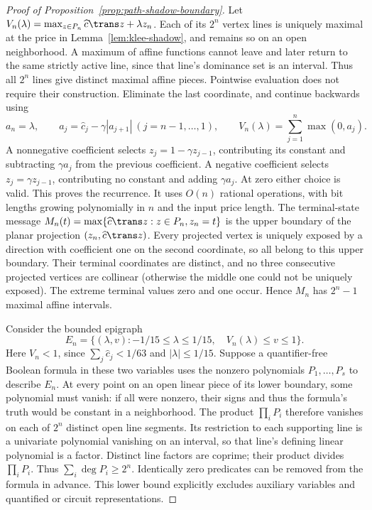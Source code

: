 \begin{proof}[Proof of Proposition~\ref{prop:path-shadow-boundary}]
Let \(V_n(\lambda)=\max_{z\in P_n}\widehat c\trans z+\lambda z_n\).
Each of its \(2^n\) vertex lines is uniquely maximal at the price in
Lemma~\ref{lem:klee-shadow}, and remains so on an open neighborhood. A maximum
of affine functions cannot leave and later return to the same strictly active
line, since that line's dominance set is an interval. Thus all \(2^n\) lines
give distinct maximal affine pieces.
Pointwise evaluation does not require their construction. Eliminate the last
coordinate, and continue backwards using
\[
 a_n=\lambda,\qquad a_j=\widehat c_j-\gamma|a_{j+1}|\ (j=n-1,\ldots,1),
 \qquad V_n(\lambda)=\sum_{j=1}^n\max(0,a_j).
\]
A nonnegative coefficient selects \(z_j=1-\gamma z_{j-1}\), contributing its
constant and subtracting \(\gamma a_j\) from the previous coefficient. A
negative coefficient selects \(z_j=\gamma z_{j-1}\), contributing no constant
and adding \(\gamma a_j\). At zero either choice is valid. This proves the
recurrence. It uses \(O(n)\) rational operations, with bit lengths growing
polynomially in \(n\) and the input price length.
The terminal-state message
\(M_n(t)=\max\{\widehat c\trans z:z\in P_n,z_n=t\}\) is the upper boundary
of the planar projection \((z_n,\widehat c\trans z)\). Every projected vertex
is uniquely exposed by a direction with coefficient one on the second
coordinate, so all belong to this upper boundary. Their terminal coordinates
are distinct, and no three consecutive projected vertices are collinear
(otherwise the middle one could not be uniquely exposed). The extreme terminal
values zero and one occur. Hence \(M_n\) has \(2^n-1\) maximal affine intervals.

Consider the bounded epigraph
\[
 E_n=\{(\lambda,v):-1/15\le\lambda\le1/15,\quad
                         V_n(\lambda)\le v\le1\}.
\]
Here \(V_n<1\), since \(\sum_j\widehat c_j<1/63\) and \(|\lambda|\le1/15\).
Suppose a quantifier-free Boolean formula in these two variables uses the
nonzero polynomials \(P_1,\ldots,P_s\) to describe \(E_n\).
At every point on an open linear piece of its lower boundary, some polynomial
must vanish: if all were nonzero, their signs and thus the formula's truth
would be constant in a neighborhood. The product \(\prod_iP_i\) therefore
vanishes on each of \(2^n\) distinct open line segments. Its restriction to
each supporting line is a univariate polynomial vanishing on an interval, so
that line's defining linear polynomial is a factor. Distinct line factors are
coprime; their product divides \(\prod_iP_i\). Thus
\(\sum_i\deg P_i\ge2^n\). Identically zero predicates can be removed from
the formula in advance. This lower bound explicitly excludes auxiliary
variables and quantified or circuit representations.
\end{proof}


